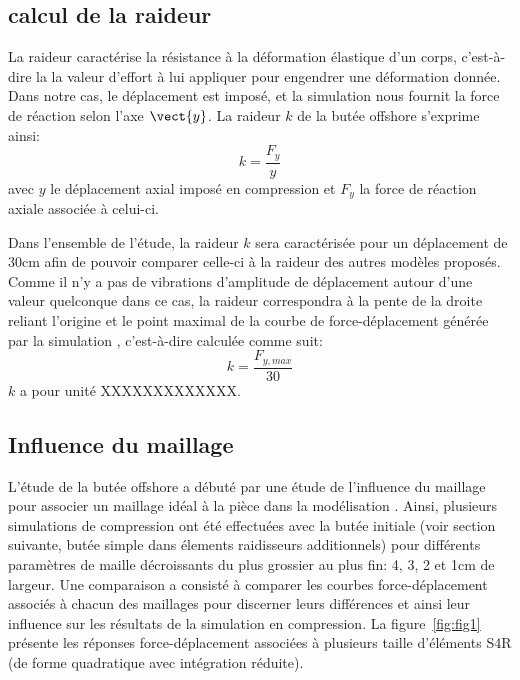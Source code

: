 ﻿ \documentclass{article}
\newcommand{\abaqus}{\bsc{Abaqus}\xspace}
\begin{document}
\subsection{calcul de la raideur}

La raideur caractérise la résistance à la déformation élastique d'un corps, c'est-à-dire la la valeur d'effort à lui appliquer pour engendrer une déformation donnée. Dans notre cas, le déplacement est imposé, et la simulation \abaqus nous fournit la force de réaction selon l'axe $\vect{y}$. La raideur $k$ de la butée offshore s'exprime ainsi:
\begin{displaymath}
		k=\frac{F_{y}}{y}
	\end{displaymath}
avec $y$ le déplacement axial imposé en compression et $F_{y}$ la force de réaction axiale associée à celui-ci. 

Dans l'ensemble de l'étude, la raideur $k$ sera caractérisée pour un déplacement de 30cm afin de pouvoir comparer celle-ci à la raideur des autres modèles proposés. Comme il n'y a pas de vibrations d'amplitude de déplacement autour d'une valeur quelconque dans ce cas, la raideur correspondra à la pente de la droite reliant l'origine et le point maximal de la courbe de force-déplacement générée par la simulation \abaqus, c'est-à-dire calculée comme suit:
\begin{displaymath}
		k=\frac{F_{y,max}}{30}
	\end{displaymath}
$k$ a pour unité XXXXXXXXXXXXX.


\subsection{Influence du maillage}

L'étude de la butée offshore a débuté par une étude de l'influence du maillage pour associer un maillage idéal à la pièce dans la modélisation \Abaqus. Ainsi, plusieurs simulations de compression ont été effectuées avec la butée initiale (voir section suivante, butée simple dans élements raidisseurs additionnels) pour différents paramètres de maille décroissants du plus grossier au plus fin: 4, 3, 2 et 1cm de largeur.
Une comparaison a consisté à comparer les courbes force-déplacement associés à chacun des maillages pour discerner leurs différences et ainsi leur influence sur les résultats de la simulation en compression. La figure~\ref{fig:fig1} présente les réponses force-déplacement associées à plusieurs taille d'éléments S4R (de forme quadratique avec intégration réduite).
\end{document}
